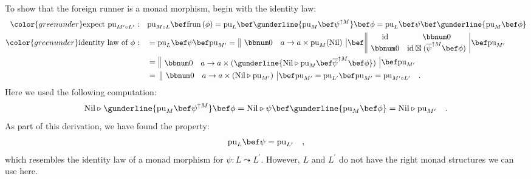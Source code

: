To show that the foreign runner is a monad morphism, begin with the
identity law:
\begin{align*}
{\color{greenunder}\text{expect }\text{pu}_{M^{\prime}\circ L^{\prime}}:}\quad & \text{pu}_{M\circ L}\bef\text{frun}\,(\phi)=\text{pu}_{L}\bef\gunderline{\text{pu}_{M}\bef\psi^{\uparrow M}}\bef\phi=\text{pu}_{L}\bef\psi\bef\gunderline{\text{pu}_{M}\bef\phi}\\
{\color{greenunder}\text{identity law of }\phi:}\quad & =\text{pu}_{L}\bef\psi\bef\text{pu}_{M^{\prime}}=\,\begin{array}{||cc|}
\bbnum 0 & a\rightarrow a\times\text{pu}_{M}(\text{Nil})\end{array}\,\bef\,\begin{array}{||cc|}
\text{id} & \bbnum 0\\
\bbnum 0 & \text{id}\boxtimes(\overline{\psi}^{\uparrow M}\bef\phi)
\end{array}\,\bef\text{pu}_{M^{\prime}}\\
 & =\,\begin{array}{||cc|}
\bbnum 0 & a\rightarrow a\times(\gunderline{\text{Nil}\triangleright\text{pu}_{M}\bef\overline{\psi}^{\uparrow M}\bef\phi})\end{array}\,\bef\text{pu}_{M^{\prime}}\\
 & =\,\,\begin{array}{||cc|}
\bbnum 0 & a\rightarrow a\times(\text{Nil}\triangleright\text{pu}_{M^{\prime}})\end{array}\,\bef\text{pu}_{M^{\prime}}=\text{pu}_{L^{\prime}}\bef\text{pu}_{M^{\prime}}=\text{pu}_{M^{\prime}\circ L^{\prime}}\quad.
\end{align*}
Here we used the following computation:
\[
\text{Nil}\triangleright\gunderline{\text{pu}_{M}\bef\psi^{\uparrow M}}\bef\phi=\text{Nil}\triangleright\psi\bef\gunderline{\text{pu}_{M}\bef\phi}=\text{Nil}\triangleright\text{pu}_{M^{\prime}}\quad.
\]
As part of this derivation, we have found the property:
\begin{equation}
\text{pu}_{L}\bef\psi=\text{pu}_{L^{\prime}}\quad,\label{eq:puL-psi-derivation1}
\end{equation}
which resembles the identity law of a monad morphism for $\psi:L\leadsto L^{\prime}$.
However, $L$ and $L^{\prime}$ do not have the right monad structures
we can use here.

